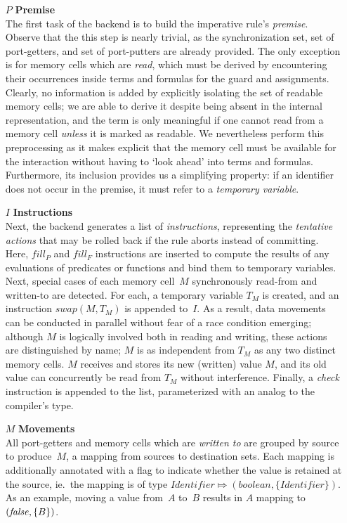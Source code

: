 \begin{enumerate}
	\item [$P$] \textbf{Premise}\\

The first task of the backend is to build the imperative rule's \textit{premise}. Observe that the this step is nearly trivial, as the synchronization set, set of port-getters, and set of port-putters are already provided. The only exception is for memory cells which are \textit{read}, which must be derived by encountering their occurrences inside terms and formulas for the guard and assignments. Clearly, no information is added by explicitly isolating the set of readable memory cells; we are able to derive it despite being absent in the internal representation, and the term is only meaningful if one cannot read from a memory cell \textit{unless} it is marked as readable. We nevertheless perform this preprocessing as it makes explicit that the memory cell must be available for the interaction without having to `look ahead' into terms and formulas. Furthermore, its inclusion provides us a simplifying property: if an identifier does not occur in the premise, it must refer to a \textit{temporary variable}.

\item [$I$] \textbf{Instructions}\\
Next, the backend generates a list of \textit{instructions}, representing the \textit{tentative actions} that may be rolled back if the rule aborts instead of committing. Here, $fill_P$ and $fill_F$ instructions are inserted to compute the results of any evaluations of predicates or functions and bind them to temporary variables. Next, special cases of each memory cell~$M$ synchronously read-from and written-to are detected. For each, a temporary variable $T_M$ is created, and an instruction $swap(M, T_M)$ is appended to~$I$. As a result, data movements can be conducted in parallel without fear of a race condition emerging; although $M$ is logically involved both in reading and writing, these actions are distinguished by name; $M$ is as independent from $T_M$ as any two distinct memory cells. $M$ receives and stores its new (written) value $M$, and its old value can concurrently be read from $T_M$ without interference. Finally, a \textit{check} instruction is appended to the list, parameterized with an analog to the compiler's  type. 

\item [$M$] \textbf{Movements}\\
All port-getters and memory cells which are \textit{written to} are grouped by source to produce~$M$, a mapping from sources to destination sets. Each mapping is additionally annotated with a flag to indicate whether the value is retained at the source, ie.\ the mapping is of type $Identifier \Mapsto{} (boolean, \{Identifier\})$. As an example, moving a value from~$A$ to~$B$ results in $A$ mapping to $(\text{\textit{false}}, \{B\})$.

\end{enumerate}
